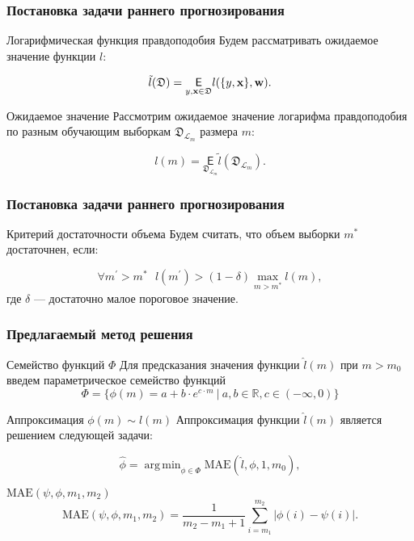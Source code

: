 \documentclass{beamer}
\DeclareMathOperator*{\argmin}{arg\,min}
\begin{document}
\begin{frame}
\frametitle{Постановка задачи раннего прогнозирования}
\begin{block}{Логарифмическая функция правдоподобия}
Будем рассматривать ожидаемое значение функции $l$:

$$
\tilde{l}(\mathfrak D)  = \underset{y, \textbf{x} \in \mathfrak D}{\mathsf E} l(\{y, \textbf{x}\}, \textbf w).
$$
\end{block}
\begin{block}{Ожидаемое значение}
Рассмотрим ожидаемое значение логарифма правдоподобия по разным обучающим выборкам $\mathfrak D_{\mathcal L_m}$ размера $m$:

$$
l(m) = \underset{\mathfrak D_{\mathcal L_m}}{\mathsf E} \tilde{l}(\mathfrak D_{\mathcal L_m}).
$$
\end{block}
\end{frame}


\begin{frame}
\frametitle{Постановка задачи раннего прогнозирования}
\begin{block}{Критерий достаточности объема}
Будем считать, что объем выборки $m^*$ достаточнен, если:

$$
\forall m^{\prime} > m^* ~~~ l(m^{\prime}) > (1 - \delta)\max\limits_{m > m^*}l(m),
$$
где $\delta$ --- достаточно малое пороговое значение.
\end{block}
\end{frame}

\begin{frame}
\frametitle{Предлагаемый метод решения}

\begin{block}{Семейство функций $\Phi$}
Для предсказания значения функции $\hat{l}(m)$ при $m > m_0$ введем параметрическое семейство функций 
\begin{equation}\label{Phi}
\Phi = \{\phi(m) =  a + b\cdot e^{c \cdot m} ~|~ a, b \in \mathbb{R}, c \in (-\infty, 0)\}
\end{equation}
\end{block}

\begin{block}{Аппроксимация $\phi(m) \sim l(m)$}
Аппроксимация функции  $\hat{l}(m)$ является решением следующей задачи:

\begin{equation}\label{argmin_MAPE}
\hat{\phi} =  \argmin_{\phi \in \Phi}\text{MAE}(\hat{l}, \phi, 1, m_0),
\end{equation}
\end{block}

\begin{block}{$\text{MAE}(\psi, \phi, m_1, m_2)$}
\begin{equation}\label{MAE}
\text{MAE}(\psi, \phi, m_1, m_2) = \frac{1}{m_2 - m_1 + 1}\sum_{i=m_1}^{m_2}|\phi(i) - \psi(i)|.
\end{equation}
\end{block}

\end{frame}
\end{document}
